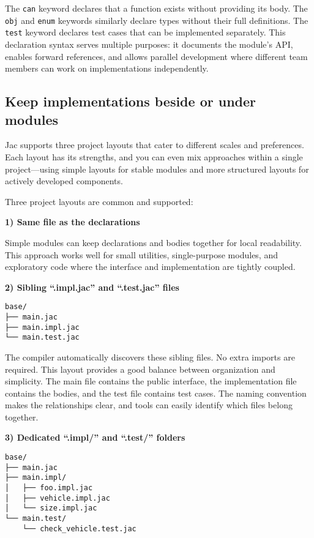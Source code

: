 The \texttt{can} keyword declares that a function exists without providing its body. The \texttt{obj} and \texttt{enum} keywords similarly declare types without their full definitions. The \texttt{test} keyword declares test cases that can be implemented separately. This declaration syntax serves multiple purposes: it documents the module's API, enables forward references, and allows parallel development where different team members can work on implementations independently.

\subsection*{Keep implementations beside or under modules}

Jac supports three project layouts that cater to different scales and preferences. Each layout has its strengths, and you can even mix approaches within a single project—using simple layouts for stable modules and more structured layouts for actively developed components.

Three project layouts are common and supported:

\textbf{1) Same file as the declarations}

Simple modules can keep declarations and bodies together for local readability. This approach works well for small utilities, single-purpose modules, and exploratory code where the interface and implementation are tightly coupled.

\textbf{2) Sibling ``.impl.jac'' and ``.test.jac'' files}

\begin{lstlisting}[language=shell]
base/
├── main.jac
├── main.impl.jac
└── main.test.jac
\end{lstlisting}

The compiler automatically discovers these sibling files. No extra imports are required. This layout provides a good balance between organization and simplicity. The main file contains the public interface, the implementation file contains the bodies, and the test file contains test cases. The naming convention makes the relationships clear, and tools can easily identify which files belong together.

\textbf{3) Dedicated ``.impl/'' and ``.test/'' folders}

\begin{lstlisting}[language=shell]
base/
├── main.jac
├── main.impl/
│   ├── foo.impl.jac
│   ├── vehicle.impl.jac
│   └── size.impl.jac
└── main.test/
    └── check_vehicle.test.jac
\end{lstlisting}

